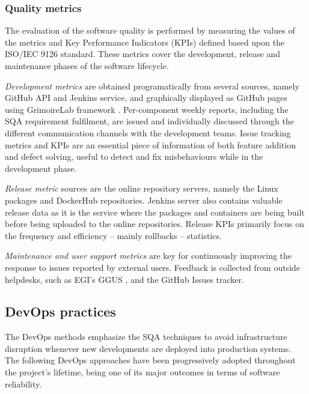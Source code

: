 \documentclass[journal]{IEEEtran}
\begin{document}
\subsubsection{Quality metrics}

The evaluation of the software quality is performed by measuring the values of
the metrics and Key Performance Indicators (KPIs) defined based upon the
ISO/IEC 9126 standard. These metrics cover the development, release and
maintenance phases of the software lifecycle.

\textit{Development metrics} are obtained programatically from several sources, namely GitHub
API and Jenkins service, and graphically displayed as GitHub pages using GrimoireLab
framework \cite{grimoirelab}. Per-component weekly reports, including the SQA requirement
fulfilment, are issued and individually discussed through the different communication channels
with the development teams. Issue tracking metrics and KPIs are an essential piece of information
of both feature addition and defect solving, useful to detect and fix misbehaviours while in the
development phase.

\textit{Release metric} sources are the online repository servers, namely the
Linux packages \cite{indigo-pkg-repo} and DockerHub \cite{indigo-dockerhub} repositories. Jenkins
server also contains valuable release data as it is the service where the packages
and containers are being built before being uploaded to the online repositories. Release
KPIs primarily focus on the frequency and efficiency -- mainly rollbacks -- statistics.

\textit{Maintenance and user support metrics} are key for continuously improving the response
to issues reported by external users. Feedback is collected from outside helpdesks, such as
EGI's GGUS \cite{ggus}, and the GitHub Issues tracker.

\subsection{DevOps practices}
\label{sec:devops}

The DevOps methods emphasize the SQA techniques to avoid infrastructure
disruption whenever new developments are deployed into production systems. The
following DevOps approaches have been progressively adopted throughout the project's
lifetime, being one of its major outcomes in terms of software reliability.
\end{document}

